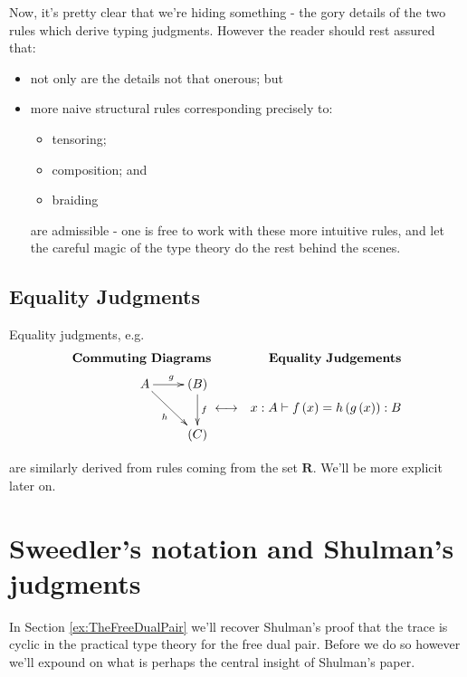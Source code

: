 \documentclass[pra,floatfix,
amsmath,superscriptaddress, 12pt]{article}
\theoremstyle{definition}
\begin{document}
Now, it's pretty clear that we're hiding something - the gory details of the two rules which derive typing judgments. However the reader should rest assured that:
\begin{itemize}
    \item not only are the details not that onerous; but
    \item more naive structural rules corresponding precisely to:
    \begin{itemize}
        \item tensoring;
        \item composition; and
        \item braiding
    \end{itemize}
    are admissible - one is free to work with these more intuitive rules, and let the careful magic of the type theory do the rest behind the scenes.
\end{itemize}




\subsection{Equality Judgments}

Equality judgments, e.g.
\begin{eqnarray*}
    \mathbf{Commuting \ Diagrams}
        &
            &
            \mathbf{Equality \ Judgements}
                \\
    \vcenter{
                \vbox{
                    \xymatrix{
                        A
                        \ar[r]^{g}
                        \ar[dr]_{h}
                            &
                            (B)
                            \ar[d]^{f}
                                \\
                            &
                                \left( C \right)}}}
        &
        \longleftrightarrow
            &
            x:A\vdash f\left(x\right)=h\left(g\left(x\right)\right):B
\end{eqnarray*}

are similarly derived from rules coming from the set $\mathbf{R}$. We'll be more explicit later on.

\section{Sweedler's notation and Shulman's judgments}

In Section \ref{ex:TheFreeDualPair} we'll recover Shulman's proof that the trace is cyclic in the practical type theory for the free dual pair. Before we do so however we'll expound on what is perhaps the central insight of Shulman's paper.
\end{document}
